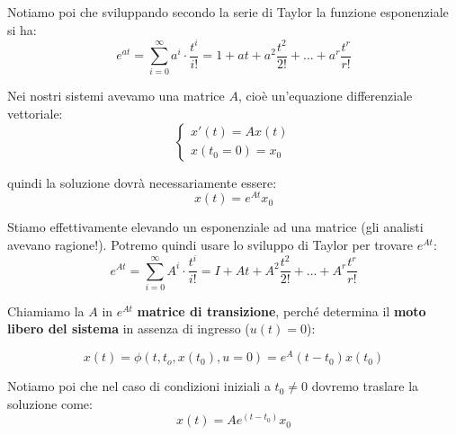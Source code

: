 \documentclass[a4paper,11pt]{article}
\begin{document}
Notiamo poi che sviluppando secondo la serie di Taylor la funzione esponenziale si ha:
$$
e^{at} = \sum_{i = 0}^\infty a^i \cdot \frac{t^i}{i!} = 1 + at + a^2 \frac{t^2}{2!} + ... + a^r \frac{t^r}{r!}
$$

Nei nostri sistemi avevamo una matrice $A$, cioè un'equazione differenziale vettoriale:
\[
	\begin{cases}			
		x'(t) = Ax(t) \\ 
		x(t_0 = 0) = x_0
	\end{cases}
\]

quindi la soluzione dovrà necessariamente essere:
$$
x(t) = e^{At} x_0
$$

Stiamo effettivamente elevando un esponenziale ad una matrice (gli analisti avevano ragione!).
Potremo quindi usare lo sviluppo di Taylor per trovare $e^{At}$:
$$
e^{At} = \sum_{i = 0}^\infty A^i \cdot \frac{t^i}{i!} = I + At + A^2 \frac{t^2}{2!} + ... + A^r \frac{t^r}{r!}
$$

Chiamiamo la $A$ in $e^{At}$ \textbf{matrice di transizione}, perché determina il \textbf{moto libero del sistema} in assenza di ingresso ($u(t) = 0$):

$$
x(t) = \phi(t, t_o, x(t_0), u = 0) = e^A(t- t_0)x(t_0)
$$

Notiamo poi che nel caso di condizioni iniziali a $t_0 \neq 0$ dovremo traslare la soluzione come:
$$
x(t) = Ae^{(t - t_0)} x_0
$$
\end{document}
